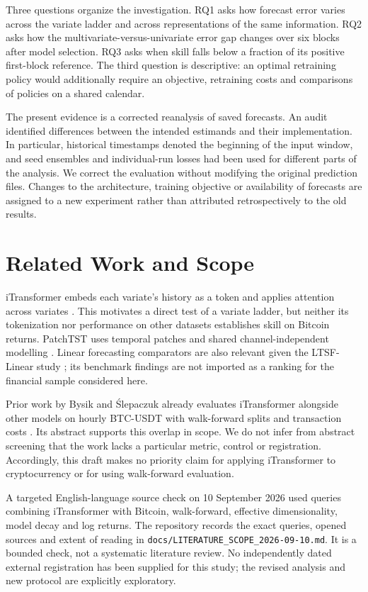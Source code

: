\documentclass[onecolumn,journal,a4paper,11pt]{IEEEtran}
\begin{document}
Three questions organize the investigation. RQ1 asks how forecast error varies
across the variate ladder and across representations of the same information.
RQ2 asks how the multivariate-versus-univariate error gap changes over six
blocks after model selection. RQ3 asks when skill falls below a fraction of
its positive first-block reference. The third question is descriptive: an
optimal retraining policy would additionally require an objective, retraining
costs and comparisons of policies on a shared calendar.

The present evidence is a corrected reanalysis of saved forecasts. An audit
identified differences between the intended estimands and their implementation.
In particular, historical timestamps denoted the beginning of the input
window, and seed ensembles and individual-run losses had been used for
different parts of the analysis. We correct the evaluation without modifying
the original prediction files. Changes to the architecture, training objective
or availability of forecasts are assigned to a new experiment rather than
attributed retrospectively to the old results.

\section{Related Work and Scope}
iTransformer embeds each variate's history as a token and applies attention
across variates \cite{liu2024itransformer}. This motivates a direct test of a
variate ladder, but neither its tokenization nor performance on other datasets
establishes skill on Bitcoin returns. PatchTST uses temporal patches and shared
channel-independent modelling \cite{nie2023patchtst}. Linear forecasting
comparators are also relevant given the LTSF-Linear study
\cite{zeng2023dlinear}; its benchmark findings are not imported as a
ranking for the financial sample considered here.

Prior work by Bysik and {\'S}lepaczuk already evaluates iTransformer alongside
other models on hourly BTC-USDT with walk-forward splits and transaction
costs \cite{btcwalkforward2026}. Its abstract supports this overlap in scope.
We do not infer from abstract screening that the work lacks a particular
metric, control or registration. Accordingly, this draft makes no priority
claim for applying iTransformer to cryptocurrency or for using walk-forward
evaluation.

A targeted English-language source check on 10 September 2026 used queries
combining iTransformer with Bitcoin, walk-forward, effective dimensionality,
model decay and log returns. The repository records the exact queries,
opened sources and extent of reading in
\texttt{docs/LITERATURE\_SCOPE\_2026-09-10.md}. It is a bounded check, not a
systematic literature review. No independently dated external registration
has been supplied for this study; the revised analysis and new protocol are
explicitly exploratory.
\end{document}
